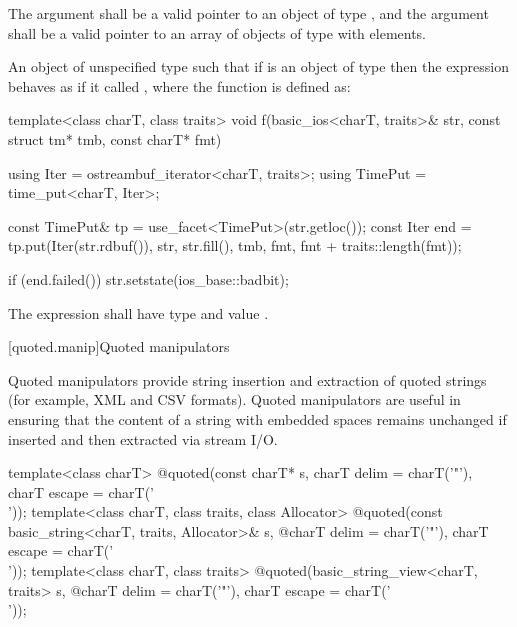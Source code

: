 \begin{itemdescr}
\pnum
\requires The argument  shall be a valid pointer to an object of type
, and the argument  shall be a valid pointer to an
array of objects of type  with
 elements.

\pnum
\returns An object of unspecified type such that if  is an object of
type  then the expression
 behaves as if it called ,
where the function  is defined as:

\begin{codeblock}
template<class charT, class traits>
void f(basic_ios<charT, traits>& str, const struct tm* tmb, const charT* fmt) {
  using Iter    = ostreambuf_iterator<charT, traits>;
  using TimePut = time_put<charT, Iter>;

  const TimePut& tp = use_facet<TimePut>(str.getloc());
  const Iter end = tp.put(Iter(str.rdbuf()), str, str.fill(), tmb,
    fmt, fmt + traits::length(fmt));

  if (end.failed())
    str.setstate(ios_base::badbit);
}
\end{codeblock}

The expression  shall have type
 and value .
\end{itemdescr}

[quoted.manip]{Quoted manipulators}

\pnum
\begin{note} Quoted manipulators provide string insertion and extraction of quoted strings (for example, XML and CSV formats). Quoted manipulators are useful in ensuring that the content of a string with embedded spaces remains unchanged if inserted and then extracted via stream I/O. \end{note}

%
\begin{itemdecl}
template<class charT>
  @\unspec@ quoted(const charT* s, charT delim = charT('"'), charT escape = charT('\\'));
template<class charT, class traits, class Allocator>
  @\unspec@ quoted(const basic_string<charT, traits, Allocator>& s,
  @\itcorr@                   charT delim = charT('"'), charT escape = charT('\\'));
template<class charT, class traits>
  @\unspec@ quoted(basic_string_view<charT, traits> s,
  @\itcorr@                   charT delim = charT('"'), charT escape = charT('\\'));
\end{itemdecl}

